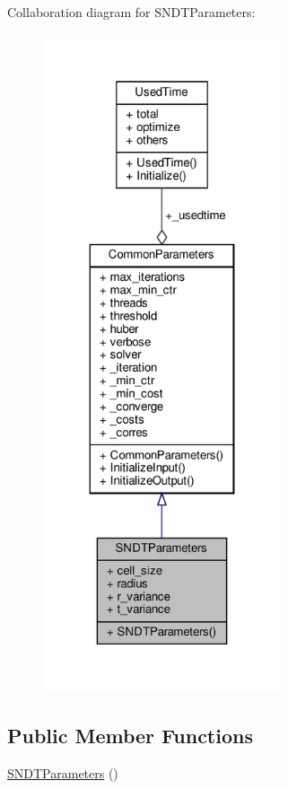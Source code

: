 Collaboration diagram for S\+N\+D\+T\+Parameters\+:\nopagebreak
\begin{figure}[H]
\begin{center}
\leavevmode
\includegraphics[height=550pt]{d1/df7/structSNDTParameters__coll__graph}
\end{center}
\end{figure}
\subsection*{Public Member Functions}
\begin{DoxyCompactItemize}
\item 
\hyperlink{structSNDTParameters_a8e838a0dcf9f93394f533d14ab8eda0a}{S\+N\+D\+T\+Parameters} ()
\end{DoxyCompactItemize}
